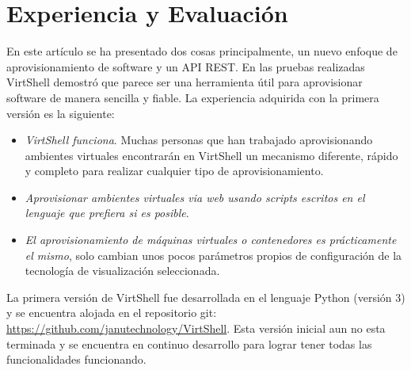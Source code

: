 \documentclass[conference, spanish]{IEEEtran}
\begin{document}

\section{Experiencia y Evaluación}
En este artículo se ha presentado dos cosas principalmente, un nuevo enfoque de aprovisionamiento de software y un API REST. En las pruebas realizadas VirtShell demostró que parece ser una herramienta útil para aprovisionar software de manera sencilla y fiable. La experiencia adquirida con la primera versión es la siguiente:
\begin{itemize}
\item \emph{VirtShell funciona}. Muchas personas que han trabajado aprovisionando ambientes virtuales encontrarán en VirtShell un mecanismo diferente, rápido y completo para realizar cualquier tipo de aprovisionamiento.
\item \emph{Aprovisionar ambientes virtuales via web usando scripts escritos en el lenguaje que prefiera si es posible}.
\item \emph{El aprovisionamiento de máquinas virtuales o contenedores es prácticamente el mismo}, solo cambian unos pocos parámetros propios de configuración de la tecnología de visualización seleccionada.
\end{itemize}
La primera versión de VirtShell fue desarrollada en el lenguaje Python (versión 3) y se encuentra alojada en el repositorio git: \url{https://github.com/janutechnology/VirtShell}. Esta versión inicial aun no esta terminada y se encuentra en continuo desarrollo para lograr tener todas las funcionalidades funcionando. 
\end{document}
